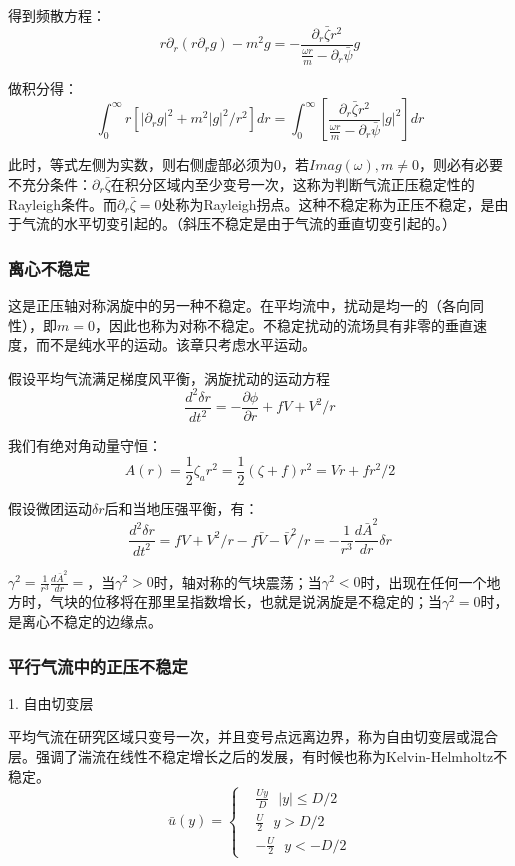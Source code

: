 \documentclass{article}
\begin{document}
得到频散方程：
$$r\partial_r(r\partial_r g)-m^2g=-\frac{\partial_r\bar{\zeta}r^2}{\frac{\omega r}{m}-\partial_r\bar{\psi}}g$$

做积分得：
$$\int_0^{\infty}r\left[|\partial_r g|^2 + m^2|g|^2/r^2\right]dr=\int_0^\infty\left[\frac{\partial_r\bar{\zeta}r^2}{\frac{\omega r}{m}-\partial_r\bar{\psi}}|g|^2\right]dr$$

此时，等式左侧为实数，则右侧虚部必须为$0$，若$Imag(\omega),m\ne0$，则必有必要不充分条件：$\partial_r\bar{\zeta}$在积分区域内至少变号一次，这称为判断气流正压稳定性的Rayleigh条件。而$\partial_r\bar{\zeta}=0$处称为Rayleigh拐点。这种不稳定称为正压不稳定，是由于气流的水平切变引起的。（斜压不稳定是由于气流的垂直切变引起的。）


\subsubsection{离心不稳定}
这是正压轴对称涡旋中的另一种不稳定。在平均流中，扰动是均一的（各向同性），即$m=0$，因此也称为对称不稳定。不稳定扰动的流场具有非零的垂直速度，而不是纯水平的运动。该章只考虑水平运动。

假设平均气流满足梯度风平衡，涡旋扰动的运动方程
$$\frac{d^2\delta r}{dt^2} = -\frac{\partial \phi}{\partial r} + fV + V^2/r$$

我们有绝对角动量守恒：
$$A(r) = \frac{1}{2}\zeta_a r^2 = \frac{1}{2}(\zeta + f)r^2=Vr+fr^2/2$$

假设微团运动$\delta r$后和当地压强平衡，有：
$$\frac{d^2\delta r}{dt^2} = fV + V^2/r - f\bar{V} - \bar{V}^2/r
=-\frac{1}{r^3}\frac{d\bar{A}^2}{dr}\delta r$$

$\gamma^2=\frac{1}{r^3}\frac{d\bar{A}^2}{dr}=$，当$\gamma^2>0$时，轴对称的气块震荡；当$\gamma^2<0$时，出现在任何一个地方时，气块的位移将在那里呈指数增长，也就是说涡旋是不稳定的；当$\gamma^2=0$时，是离心不稳定的边缘点。


\subsubsection{平行气流中的正压不稳定}
1. 自由切变层

平均气流在研究区域只变号一次，并且变号点远离边界，称为自由切变层或混合层。强调了湍流在线性不稳定增长之后的发展，有时候也称为Kelvin-Helmholtz不稳定。
$$\bar{u}(y)=\begin{cases}
&\frac{Uy}{D} \ \ \    |y| \le D/2 \\
&\frac{U}{2}  \ \ \  y > D/2 \\
&-\frac{U}{2} \ \ \  y < -D/2
\end{cases}$$
\end{document}
